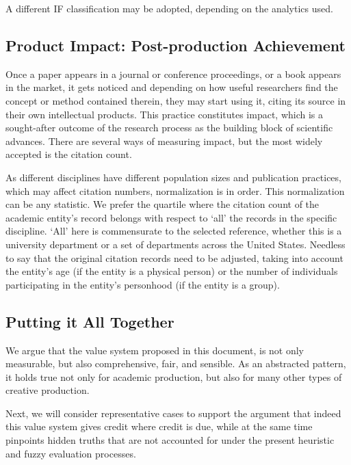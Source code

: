 A different IF classification may be adopted, depending on the analytics used.


\subsection {Product Impact: Post-production Achievement}
Once a paper appears in a journal or conference proceedings, or a book appears in the market, it gets noticed and depending on how useful researchers find the concept or method contained therein, they may start using it, citing its source in their own intellectual products. This practice constitutes impact, which is a sought-after outcome of the research process as the building block of scientific advances. There are several ways of measuring impact, but the most widely accepted is the citation count.

As different disciplines have different population sizes and publication practices, which may affect citation numbers, normalization is in order. This normalization can be any statistic. We prefer the quartile where the citation count of the academic entity's record belongs with respect to `all' the records in the specific discipline.  `All' here is commensurate to the selected reference, whether this is a university department or a set of departments across the United States. Needless to say that the original citation records need to be adjusted, taking into account the entity's age (if the entity is a physical person) or the number of individuals participating in the entity's personhood (if the entity is a group).


\subsection {Putting it All Together}

We argue that the value system proposed in this document, is not only measurable, but also comprehensive, fair, and sensible. As an abstracted pattern, it holds true not only for academic production, but also for many other types of creative production. 

Next, we will consider representative cases to support the argument that indeed this value system gives credit where credit is due, while at the same time pinpoints hidden truths that are not accounted for under the present heuristic and fuzzy evaluation processes. 

